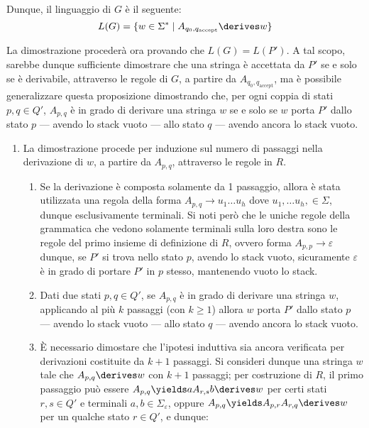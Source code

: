 \documentclass[a4paper, 12pt]{report}
\begin{document}
{        Dunque, il linguaggio di $G$ è il seguente: $$L(G) = \{w \in \Sigma^* \mid A_{q_0, q_{\mathrm{accept}}} \derives w\}$$

        La dimostrazione procederà ora provando che $L(G) = L(P')$. A tal scopo, sarebbe dunque sufficiente dimostrare che una stringa è accettata da $P'$ se e solo se è derivabile, attraverso le regole di $G$, a partire da $A_{q_0, q_\mathrm{accept}}$, ma è possibile generalizzare questa proposizione dimostrando che, per ogni coppia di stati $p, q \in Q'$, $A_{p,q}$ è in grado di derivare una stringa $w$ se e solo se $w$ porta $P'$ dallo stato $p$ --- avendo lo stack vuoto --- allo stato $q$ --- avendo ancora lo stack vuoto.

        \begin{enumerate}[label=]
            \item {} La dimostrazione procede per induzione sul numero di passaggi nella derivazione di $w$, a partire da $A_{p,q}$, attraverso le regole in $R$.
                \begin{enumerate}[label=]
                    \item {} Se la derivazione è composta solamente da 1 passaggio, allora è stata utilizzata una regola della forma $A_{p,q} \to u_1 \ldots u_h$ dove $u_1, \ldots u_h, \in \Sigma$, dunque esclusivamente terminali. Si noti però che le uniche regole della grammatica che vedono solamente terminali sulla loro destra sono le regole del primo insieme di definizione di $R$, ovvero forma $A_{p,p} \to \varepsilon$ dunque, se $P'$ si trova nello stato $p$, avendo lo stack vuoto, sicuramente $\varepsilon$ è in grado di portare $P'$ in $p$ stesso, mantenendo vuoto lo stack.
                    \item {} Dati due stati $p, q \in Q'$, se $A_{p,q}$ è in grado di derivare una stringa $w$, applicando al più $k$ passaggi (con $k \ge 1$) allora $w$ porta $P'$ dallo stato $p$ --- avendo lo stack vuoto --- allo stato $q$ --- avendo ancora lo stack vuoto.
                    \item {} È necessario dimostare che l'ipotesi induttiva sia ancora verificata per derivazioni costituite da $k + 1$ passaggi. Si consideri dunque una stringa $w$ tale che $A_{p,q} \derives w$ con $k + 1$ passaggi; per costruzione di $R$, il primo passaggio può essere $A_{p,q} \yields aA_{r,s}b \derives w$ per certi stati $r, s \in Q'$ e terminali $a, b \in \Sigma_\varepsilon$, oppure $A_{p,q} \yields A_{p,r} A_{r,q} \derives w$ per un qualche stato $r \in Q'$, e dunque:


\end{enumerate}
\end{enumerate}}
\end{document}

